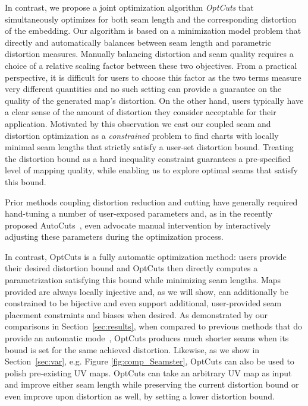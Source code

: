In contrast, we propose a joint optimization algorithm {\em OptCuts} that simultaneously optimizes for both seam length and the corresponding distortion of the embedding.
Our algorithm is based on a minimization model problem that directly and automatically balances between seam length and parametric distortion measures. Manually balancing distortion and seam quality requires a choice of a relative scaling factor between these two objectives. From a practical perspective, it is difficult for users to choose this factor as the two terms measure very different quantities and no such setting can provide a guarantee on the quality of the generated map's distortion. 
On the other hand, users typically have a clear sense of the amount of distortion they consider acceptable for their application. Motivated by this observation we cast our coupled seam and distortion optimization as a \emph{constrained} problem to find charts with locally minimal seam lengths that strictly satisfy a user-set distortion bound. Treating the distortion bound as a hard inequality constraint guarantees a pre-specified level of mapping quality, while enabling us to explore optimal seams that satisfy this bound. %

Prior methods coupling distortion reduction and cutting have generally required hand-tuning a number of user-exposed parameters and, as in the recently proposed AutoCuts~\cite{Poranne2017Autocuts}, even advocate manual intervention by interactively adjusting these parameters during the optimization process.

In contrast, OptCuts is a fully automatic optimization method: users provide their desired distortion bound and OptCuts then directly computes a parametrization satisfying this bound while minimizing seam lengths. Maps provided are always locally injective and, as we will show, can additionally be constrained to be bijective and even support additional, user-provided seam placement constraints and biases when desired. 
As demonstrated by our comparisons in Section~\ref{sec:results},
when compared to previous methods that do provide an automatic mode~\cite{BoundedDistortParam:2002,Poranne2017Autocuts}, OptCuts produces much shorter seams when its bound is set for the same achieved distortion. 
Likewise, as we show in Section~\ref{sec:var}, e.g. Figure \ref{fig:comp_Seamster}, OptCuts can also be used to polish pre-existing UV maps. 
OptCuts can take an arbitrary UV map as input and improve either seam length while preserving the current distortion bound or even improve upon distortion as well, by setting a lower distortion bound.

